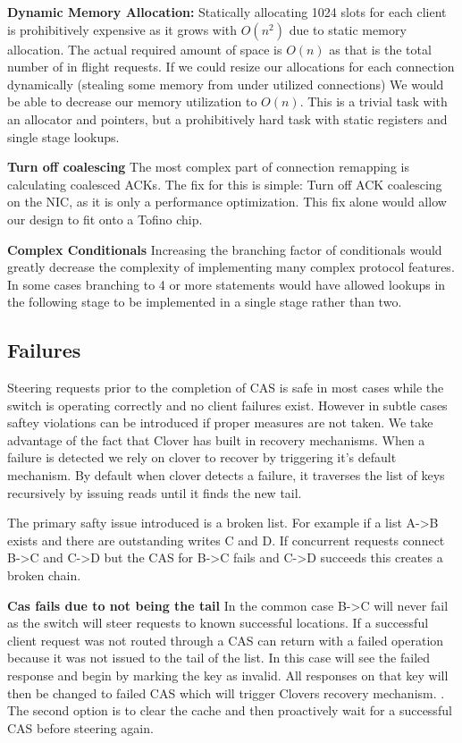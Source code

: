 \textbf{Dynamic Memory Allocation:}
Statically allocating 1024 slots for each client is prohibitively expensive as
it grows with $O(n^2)$ due to static memory allocation. The actual required
amount of space is $O(n)$ as that is the total number of in flight requests. If
we could resize our allocations for each connection dynamically (stealing some
memory from under utilized connections) We would be able to decrease our memory
utilization to $O(n)$. This is a trivial task with an allocator and pointers, but
a prohibitively hard task with static registers and single stage lookups.

\textbf{Turn off coalescing} The most complex part of connection remapping is
calculating coalesced ACKs. The fix for this is simple: Turn off ACK coalescing
on the NIC, as it is only a performance optimization. This fix alone would allow
our design to fit onto a Tofino chip.

\textbf{Complex Conditionals} Increasing the branching factor of conditionals
would greatly decrease the complexity of implementing many complex protocol
features. In some cases branching to 4 or more statements would have allowed
lookups in the following stage to be implemented in a single stage rather than
two.

\subsection{Failures}

Steering requests prior to the completion of CAS is safe in most cases while the
switch is operating correctly and no client failures exist. However in subtle
cases saftey violations can be introduced if proper measures are not taken. We
take advantage of the fact that Clover has built in recovery mechanisms. When a
failure is detected we rely on clover to recover by triggering it's default
mechanism. By default when clover detects a failure, it traverses the list of
keys recursively by issuing reads until it finds the new tail.

The primary safty issue introduced is a broken list. For example if a list A->B
exists and there are outstanding writes C and D. If concurrent requests connect
B->C and C->D but the CAS for B->C fails and C->D succeeds this creates a broken
chain.

\textbf{Cas fails due to not being the tail}
In the common case B->C will never fail as the switch will steer requests to
known successful locations. If a successful client request was not routed
through {\sword} a CAS can return with a failed operation because it was not
issued to the tail of the list. In this case {\sword} will see the failed
response and begin by marking the key as invalid. All responses on that key will
then be changed to failed CAS which will trigger Clovers recovery mechanism.
. The second option is to clear the cache
and then proactively wait for a successful CAS before steering again.

